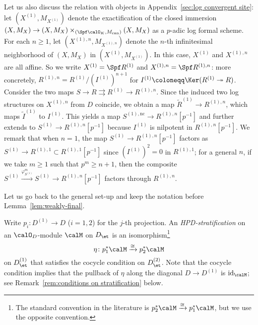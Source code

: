 \begin{eg}
Let us also discuss the relation with objects in Appendix~\ref{sec:log convergent site}: let $(X^{(1)},M_{X^{(1)}})$ denote the exactification of the closed immersion $(X,M_X)\rightarrow (X,M_X)\times_{(\Spf \calO_K,M_\mathrm{can})}(X,M_X)$ as a $p$-adic log formal scheme. For each $n \geq 1$, let $(X^{(1),n}, M_{X^{(1),n}})$ denote the $n$-th infinitesimal neighborhood of $(X, M_X)$ in $(X^{(1)}, M_{X^{(1)}})$. In this case, $X^{(1)}$ and $X^{(1),n}$ are all affine. So we write $X^{(1)}=\Spf R^{(1)}$ and $X^{(1),n}=\Spf R^{(1),n}$: more concretely, $R^{(1),n}=R^{(1)}/(I^{(1)})^{n+1}$ for $I^{(1)}\coloneqq \Ker(R^{(1)}\twoheadrightarrow R)$. 
Consider the two maps $S\rightarrow R\rightrightarrows R^{(1)}\rightarrow R^{(1),n}$. Since the induced two log structures on $X^{(1),n}$ from $D$ coincide, we obtain a map $\widetilde{R}^{(1)}\rightarrow R^{(1),n}$, which maps $\tilde{I}^{(1)}$ to $I^{(1)}$. This yields a map $S^{(1),\mathrm{nc}}\rightarrow R^{(1),n}[p^{-1}]$ and further extends to $S^{(1)}\rightarrow R^{(1),n}[p^{-1}]$ because $I^{(1)}$ is nilpotent in $R^{(1),n}[p^{-1}]$. We remark that when $n=1$, the map $S^{(1)}\rightarrow R^{(1),n}[p^{-1}]$ factors as $S^{(1)}\rightarrow R^{(1),1}\subset R^{(1),1}[p^{-1}]$ since $(I^{(1)})^2=0$ in $R^{(1),1}$; for a general $n$, if we take $m\geq 1$ such that $p^m\geq n+1$, then the composite $S^{(1)}\xrightarrow{\varphi^m_{S^{(1)}}}S^{(1)}\rightarrow R^{(1),n}[p^{-1}]$ factors through $R^{(1),n}$.
\end{eg}

Let us go back to the general set-up and keep the notation before Lemma~\ref{lem:weakly-final}.

\begin{defn}
Write $p_i\colon D^{(1)}\rightarrow D$ ($i=1,2$) for the $j$-th projection.
    An \emph{HPD-stratification} on an $\calO_D$-module $\calM$ on $D_\et$ is an isomorphism\footnote{The standard convention in the literature is $p_2^\ast \calM \xrightarrow{\cong}p_1^\ast\calM$, but we use the opposite convention.} 
    \[
    \eta\colon p_1^\ast \calM \xrightarrow{\cong}p_2^\ast \calM 
    \]
    on $D^{(1)}_\et$ that satisfies the cocycle condition on $D^{(2)}_\et$. Note that the cocycle condition implies that the pullback of $\eta$ along the diagonal $D\rightarrow D^{(1)}$ is $\mathrm{id}_{\calM}$; see Remark~\ref{rem:conditions on stratification} below.    
\end{defn}

